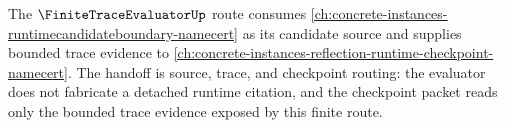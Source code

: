 The $\FiniteTraceEvaluatorUp$ route consumes \autoref{ch:concrete-instances-runtimecandidateboundary-namecert} as its candidate source and supplies bounded trace evidence to \autoref{ch:concrete-instances-reflection-runtime-checkpoint-namecert}. The handoff is source, trace, and checkpoint routing: the evaluator does not fabricate a detached runtime citation, and the checkpoint packet reads only the bounded trace evidence exposed by this finite route.
